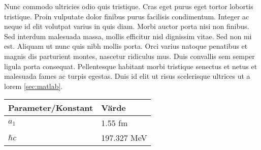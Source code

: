 Nunc commodo ultricies odio quis tristique. Cras eget purus eget tortor lobortis tristique. Proin vulputate dolor finibus purus facilisis condimentum. Integer ac neque id elit volutpat varius in quis diam. Morbi auctor porta nisi non finibus. Sed interdum malesuada massa, mollis efficitur nisl dignissim vitae. Sed non mi est. Aliquam ut nunc quis nibh mollis porta. Orci varius natoque penatibus et magnis dis parturient montes, nascetur ridiculus mus. Duis convallis sem semper ligula porta consequat. Pellentesque habitant morbi tristique senectus et netus et malesuada fames ac turpis egestas. Duis id elit ut risus scelerisque ultrices ut a lorem \ref{sec:matlab}.

\begin{Table}
\captionsetup{labelfont=bf}
\begin{tabularx}{\textwidth}{XX}
\hline
Parameter/Konstant  & Värde       \\ %
\hline
$a_1$     & 1.55 fm     \\
$\hbar c$ & 197.327 MeV \\ \hline
\end{tabularx}
\label{tab:const}
\end{Table}